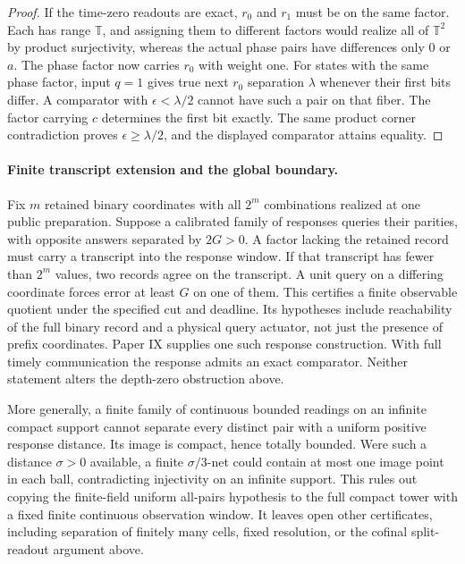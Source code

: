 \documentclass[11pt,a4paper]{article}
\theoremstyle{definition}
\begin{document}
\begin{proof}
If the time-zero readouts are exact, $r_0$ and $r_1$ must be on the same factor. Each has range $\mathbb T$, and assigning them to different factors would realize all of $\mathbb T^2$ by product surjectivity, whereas the actual phase pairs have differences only $0$ or $a$. The phase factor now carries $r_0$ with weight one. For states with the same phase factor, input $q=1$ gives true next $r_0$ separation $\lambda$ whenever their first bits differ. A comparator with $\epsilon<\lambda/2$ cannot have such a pair on that fiber. The factor carrying $c$ determines the first bit exactly. The same product corner contradiction proves $\epsilon\ge\lambda/2$, and the displayed comparator attains equality.
\end{proof}


\paragraph{Finite transcript extension and the global boundary.}
Fix $m$ retained binary coordinates with all $2^m$ combinations realized
at one public preparation. Suppose a calibrated family of responses
queries their parities, with opposite answers separated by $2G>0$.
A factor lacking the retained record must carry a transcript into the
response window. If that transcript has fewer than $2^m$ values, two
records agree on the transcript. A unit query on a differing coordinate
forces error at least $G$ on one of them. This certifies a finite
observable quotient under the specified cut and deadline. Its hypotheses
include reachability of the full binary record and a physical query
actuator, not just the presence of prefix coordinates. Paper IX supplies
one such response construction. With full timely communication the
response admits an exact comparator. Neither statement alters the
depth-zero obstruction above.

More generally, a finite family of continuous bounded readings on an
infinite compact support cannot separate every distinct pair with a
uniform positive response distance. Its image is compact, hence totally
bounded. Were such a distance $\sigma>0$ available, a finite
$\sigma/3$-net could contain at most one image point in each ball,
contradicting injectivity on an infinite support. This rules out copying
the finite-field uniform all-pairs hypothesis to the full compact tower
with a fixed finite continuous observation window. It leaves open other
certificates, including separation of finitely many cells, fixed
resolution, or the cofinal split-readout argument above.
\end{document}
